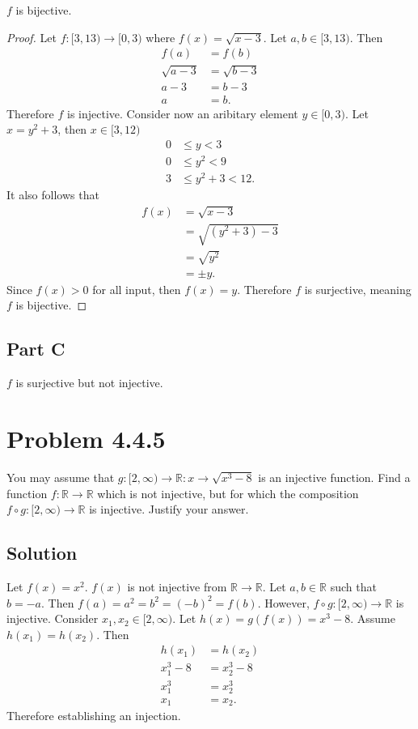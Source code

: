 \documentclass[12pt]{extarticle}
\begin{document}
$f$ is bijective.
\begin{proof}
	Let $f : [3,13) \rightarrow [0,3)$ where $f(x) = \sqrt{x-3}$. Let $a,b \in [3,13)$. Then
	\begin{align*}
		f(a) &= f(b) \\
		\sqrt{a - 3} &= \sqrt{b-3} \\
		a - 3 &= b-3 \\
		a &= b
	.\end{align*}
	Therefore $f$ is injective. Consider now an aribitary element $y \in [0,3)$. Let $x = y^2 + 3$, then $x \in [3, 12)$
	\begin{align*}
		0 &\leq y < 3 \\
		0 &\leq y^2 < 9 \\
		3 &\leq y^2 + 3 < 12.
	\end{align*} It also follows that
	\begin{align*}
		f(x) &= \sqrt{x - 3} \\
				 &= \sqrt{(y^2 + 3) - 3} \\
				 &= \sqrt{y^2} \\
				 &= \pm y
	.\end{align*}
	Since $f(x) > 0$ for all input, then $f(x) = y$. Therefore $f$ is surjective, meaning $f$ is bijective.
\end{proof}

\subsection*{Part C}

$f$ is surjective but not injective.

\section*{Problem 4.4.5}

You may assume that $g : [2, \infty) \rightarrow \mathbb{R} : x \rightarrow \sqrt{x^3 - 8}$ is an injective function. Find a function $f : \mathbb{R} \rightarrow \mathbb{R}$ which is not injective, but for which the composition $f \circ g : [2, \infty) \rightarrow \mathbb{R}$ is injective.
Justify your answer.

\subsection*{Solution}

Let $f(x) = x^2$. $f(x)$ is not injective from $\mathbb{R} \rightarrow \mathbb{R}$. Let $a,b \in \mathbb{R}$ such that $b = -a$. Then $f(a) = a^2 = b^2 = (-b)^2 = f(b)$. However, $f \circ g : [2, \infty) \rightarrow \mathbb{R}$ is injective. Consider $x_{1},x_{2} \in [2, \infty)$. Let $h(x) = g(f(x)) = x^3 - 8$. Assume $h(x_{1}) = h(x_{2})$. Then
\begin{align*}
	h(x_{1}) &= h(x_{2}) \\
	x_{1}^3 - 8 &= x_{2}^3 - 8 \\
	x_{1}^3 &= x_{2}^3 \\
	x_{1} &= x_{2}
.\end{align*}
Therefore establishing an injection.
\end{document}
